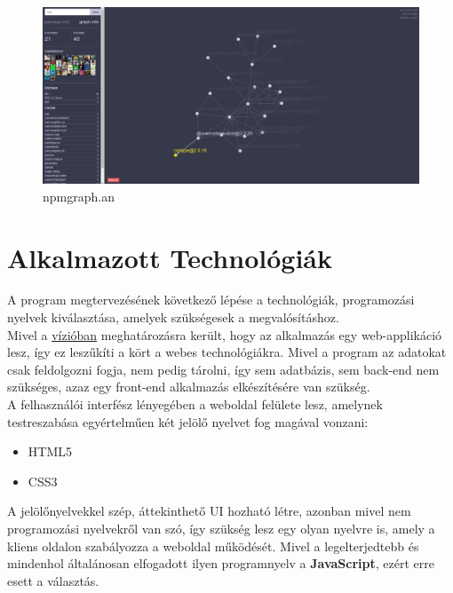 	\begin{figure}[!h]
		\centering
		\includegraphics[scale=0.2]{images/anvaka_npmgraph.png}
		\caption{npmgraph.an}
		\label{fig:sw-npmgraph}
	\end{figure}
	
	\pagebreak

\section{Alkalmazott Technológiák}

A program megtervezésének következő lépése a technológiák, programozási nyelvek kiválasztása, amelyek szükségesek a megvalósításhoz.\\

Mivel a \hyperlink{section.2.2}{vízióban} meghatározásra került, hogy az alkalmazás egy web-applikáció lesz, így ez leszűkíti a kört a webes technológiákra. Mivel a program az adatokat csak feldolgozni fogja, nem pedig tárolni, így sem adatbázis, sem back-end nem szükséges, azaz egy front-end alkalmazás elkészítésére van szükség.\\

A felhasználói interfész lényegében a weboldal felülete lesz, amelynek testreszabása egyértelműen két jelölő nyelvet fog magával vonzani:
\begin{itemize}
	\item HTML5
	\item CSS3
\end{itemize}

A jelölőnyelvekkel szép, áttekinthető UI hozható létre, azonban mivel nem programozási nyelvekről van szó, így szükség lesz egy olyan nyelvre is, amely a kliens oldalon szabályozza a weboldal működését. Mivel a legelterjedtebb és mindenhol általánosan elfogadott ilyen programnyelv a \textbf{JavaScript}, ezért erre esett a választás.\\

